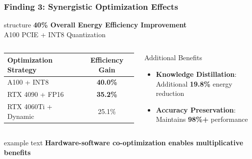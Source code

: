 \documentclass[aspectratio=169,xcolor=dvipsnames]{beamer}
\begin{document}
\begin{frame}
\frametitle{Finding 3: Synergistic Optimization Effects}

\begin{center}
\begin{beamercolorbox}[wd=0.8\textwidth,center]{structure}
\Large\textbf{40\% Overall Energy Efficiency Improvement}\\
\normalsize A100 PCIE + INT8 Quantization
\end{beamercolorbox}
\end{center}

\vspace{0.5cm}

\begin{columns}[c]
\begin{table}[h]
\centering
\footnotesize
\begin{tabular}{@{}lc@{}}
\toprule
\textbf{Optimization Strategy} & \textbf{Efficiency Gain} \\
\midrule
A100 + INT8 & \textbf{40.0\%} \\
RTX 4090 + FP16 & \textbf{35.2\%} \\
RTX 4060Ti + Dynamic & 25.1\% \\
\bottomrule
\end{tabular}
\end{table}

\begin{exampleblock}{Additional Benefits}
\begin{itemize}
\item \textbf{Knowledge Distillation}: Additional \textbf{19.8\%} energy reduction
\item \textbf{Accuracy Preservation}: Maintains \textbf{98\%+} performance
\end{itemize}
\end{exampleblock}

\end{columns}

\vspace{0.3cm}
\begin{center}
\begin{beamercolorbox}[wd=\textwidth,center]{example text}
\Large\textbf{Hardware-software co-optimization enables multiplicative benefits}
\end{beamercolorbox}
\end{center}
\end{frame}
\end{document}
